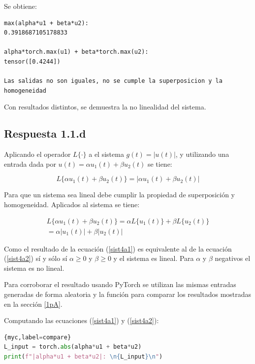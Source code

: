 \documentclass[12 pt]{article}
\begin{document}
\begin{enumerate}
Se obtiene:

\begin{lstlisting}
max(alpha*u1 + beta*u2): 
0.3918687105178833

alpha*torch.max(u1) + beta*torch.max(u2): 
tensor([0.4244])

Las salidas no son iguales, no se cumple la superposicion y la homogeneidad
\end{lstlisting}

Con resultados distintos, se demuestra la no linealidad del sistema.

\subsection{Respuesta 1.1.d}

Aplicando el operador ${L\{ \cdot \}}$ a el sistema ${g(t)=|u(t)|}$, y utilizando una entrada dada por ${u(t)=\alpha u_{1}(t) + \beta u_{2}(t)}$ se tiene:

\begin{equation}
\label{sist4a1}
    L\{ \alpha u_{1}(t) + \beta u_{2}(t) \} = |\alpha u_{1}(t) + \beta u_{2}(t)| 
\end{equation}

Para que un sistema sea lineal debe cumplir la propiedad de superposición y homogeneidad. Aplicados al sistema se tiene:

\begin{center}
\begin{equation} \label{sist4a2}
\begin{split}
 L\{ \alpha u_{1}(t) + \beta u_{2}(t) \} = \alpha L\{ u_{1}(t) \} + \beta L\{ u_{2}(t) \} \\
 = \alpha |u_{1}(t)| + \beta |u_{2}(t)|
\end{split}
\end{equation}
\end{center}

Como el resultado de la ecuación (\ref{sist4a1}) es equivalente al de la ecuación (\ref{sist4a2}) sí y sólo sí ${\alpha \geq 0}$ y ${\beta \geq 0}$ y el sistema es lineal. Para ${\alpha}$ y ${\beta}$ negativos el sistema es no lineal.

Para corroborar el resultado usando PyTorch se utilizan las mismas entradas generadas de forma aleatoria y la función para comparar los resultados mostradas en la sección \ref{1pA}.

Computando las ecuaciones (\ref{sist4a1}) y (\ref{sist4a2}):

\begin{lstlisting}[language=Python]{myc,label=compare}
L_input = torch.abs(alpha*u1 + beta*u2)
print(f"|alpha*u1 + beta*u2|: \n{L_input}\n")


\end{lstlisting}
\end{enumerate}
\end{document}

